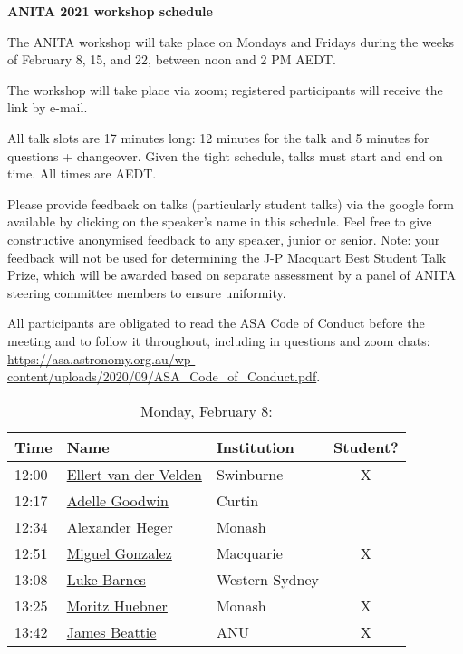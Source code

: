 \documentclass[amsmath,onecolumn]{revtex4-1}
\begin{document}
\begin{center}
{\bf ANITA 2021 workshop schedule}\\
\end{center}
\vspace{0.2in}

The ANITA workshop will take place on Mondays and Fridays during the weeks of February 8, 15, and 22, between noon and 2 PM AEDT.

The workshop will take place via zoom; registered participants will receive the link by e-mail.  

All talk slots are 17 minutes long: 12 minutes for the talk and 5 minutes for questions + changeover.  Given the tight schedule, talks must start and end on time.  All times are AEDT.

Please provide feedback on talks (particularly student talks) via the google form available by clicking on the speaker's name in this schedule.  Feel free to give constructive anonymised feedback to any speaker, junior or senior.  Note: your feedback will not be used for determining the J-P Macquart Best Student Talk Prize, which will be awarded based on separate assessment by a panel of ANITA steering committee members to ensure uniformity.

All participants are obligated to read the ASA Code of Conduct before the meeting and to follow it throughout, including in questions and zoom chats:
\url{https://asa.astronomy.org.au/wp-content/uploads/2020/09/ASA_Code_of_Conduct.pdf}.

\FloatBarrier

\begin{table}[!htbp]
	\centering
	\caption{Monday, February 8:}
\begin{tabular}{| l | l | l | c |}
	\hline
	Time & Name  & Institution & Student? \\ 		
	\hline
	12:00 & \href{https://forms.gle/ZM8HoYqw1VRShzLNA}{Ellert van der Velden} & Swinburne & X \\
	12:17 &  \href{https://forms.gle/bdRTLLNorm3c2uaN7}{Adelle Goodwin} & Curtin & \\
	12:34 &  \href{https://forms.gle/2j1D6zZwaghz1tc26}{Alexander Heger} & Monash & \\
	12:51 &  \href{https://forms.gle/ekxcKvycqdv4SmtL8}{Miguel Gonzalez} & Macquarie & X\\
	13:08 &  \href{https://forms.gle/iz2mB14cSvaC8N9QA}{Luke Barnes} & Western Sydney & \\
	13:25 &  \href{ https://forms.gle/2gdWyrt3Ngb29ewi6}{Moritz Huebner} & Monash & X \\
	13:42 & \href{https://forms.gle/x4VusjZ2K8iYSsV56}{James Beattie} & ANU  & X \\
	\hline
\end{tabular}
\end{table}
\end{document}
